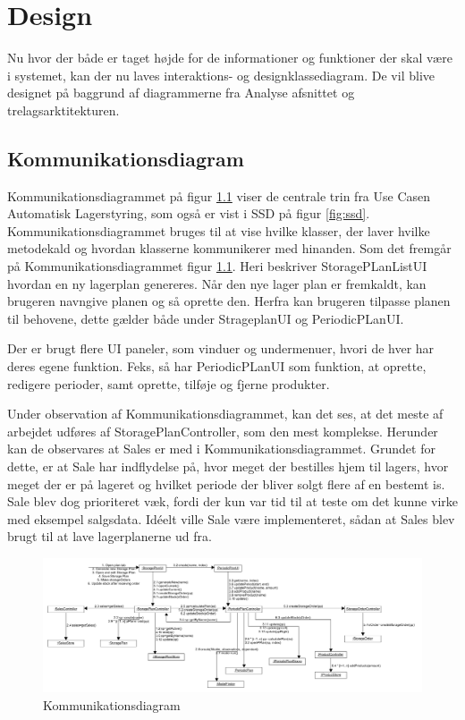 \chapter{Design}\label{ch:design}
Nu hvor der både er taget højde for de informationer og funktioner der skal være i systemet, kan der nu laves interaktions- og designklassediagram. De vil blive designet på baggrund af diagrammerne fra Analyse afsnittet og trelagsarktitekturen. 

\section{Kommunikationsdiagram}
Kommunikationsdiagrammet\cite{Larman2004} på figur \ref{fig:Kommunikationsdiagram} viser de centrale trin fra Use Casen Automatisk Lagerstyring, som også er vist i SSD på figur \ref{fig:ssd}. Kommunikationsdiagrammet bruges til at vise hvilke klasser, der laver hvilke metodekald og hvordan klasserne kommunikerer med hinanden. 
Som det fremgår på Kommunikationsdiagrammet figur \ref{fig:Kommunikationsdiagram}. Heri beskriver StoragePLanListUI hvordan en ny lagerplan genereres. Når den nye lager plan er fremkaldt, kan brugeren navngive planen og så oprette den. Herfra kan brugeren tilpasse planen til behovene, dette gælder både under StrageplanUI og PeriodicPLanUI. 

Der er brugt flere UI paneler, som vinduer og undermenuer, hvori de hver har deres egene funktion. Feks, så har PeriodicPLanUI som funktion, at oprette, redigere perioder, samt oprette, tilføje og fjerne produkter. 

Under observation af Kommunikationsdiagrammet, kan det ses, at det meste af arbejdet udføres af StoragePlanController, som den mest komplekse. Herunder kan de observares at Sales er med i Kommunikationsdiagrammet. Grundet for dette, er at Sale har indflydelse på, hvor meget der bestilles hjem til lagers, hvor meget der er på lageret og hvilket periode der bliver solgt flere af en bestemt is. 
Sale blev dog prioriteret væk, fordi der kun var tid til at teste om det kunne virke med eksempel salgsdata.
Idéelt ville Sale være implementeret, sådan at Sales blev brugt til at lave lagerplanerne ud fra.


\begin{landscape}
    \begin{figure}[p]
        \centering
        \includegraphics[width=0.8\hsize]{figures/design/Kommunikationsdiagram}
        \caption{Kommunikationsdiagram}
        \label{fig:Kommunikationsdiagram}
    \end{figure}
\end{landscape}

